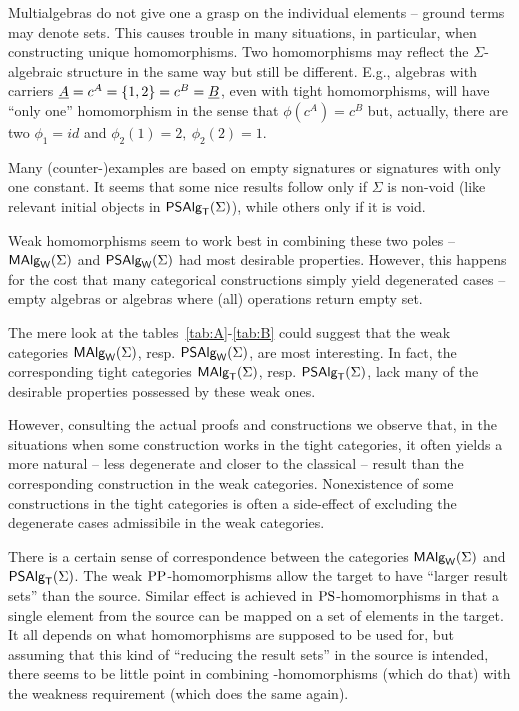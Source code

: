 \documentclass[10pt]{article}
\begin{document}
\begin{LS}
\item
Multialgebras do not give one a grasp on the individual elements --
ground terms may denote sets. This causes trouble in many situations,
in particular, when constructing unique homomorphisms. Two
homomorphisms may reflect the $\Sigma$-algebraic structure in the same
way but still be different.  E.g., algebras with carriers $\underline {A}=c^A=\{1,2\}=c^B=\underline {B}$, even with tight homomorphisms, will have
``only one'' homomorphism in the sense that $\phi(c^A)=c^B$ but,
actually, there are two $\phi_1 = id$ and $\phi_2(1)=2,\ \phi_2(2)=1$.

\item
Many (counter-)examples are based on empty signatures or signatures
with only one constant.  It seems that some nice results follow only
if $\Sigma$ is non-void (like relevant initial objects in $\mbox{\sf PSAlg}_{\sf T}(\Sigma)$),
while others only if it is void.
\begin{LSA}
\item
Weak homomorphisms seem to work best in combining these two poles --
$\mbox{\rm\sf MAlg}_{\sf W}(\Sigma)$ and $\mbox{\sf PSAlg}_{\sf W}(\Sigma)$ had most desirable properties. However, this
happens for the cost that many categorical constructions simply yield
degenerated cases -- empty algebras or algebras where (all) operations
return empty set.
\item
The mere look at the tables~\ref{tab:A}-\ref{tab:B} could suggest that
the weak categories $\mbox{\rm\sf MAlg}_{\sf W}(\Sigma)$, resp. $\mbox{\sf PSAlg}_{\sf W}(\Sigma)$, are most interesting. In
fact, the corresponding tight categories $\mbox{\rm\sf MAlg}_{\sf T}(\Sigma)$, resp. $\mbox{\sf PSAlg}_{\sf T}(\Sigma)$, lack
many of the desirable properties possessed by these weak ones.

However, consulting the actual proofs and constructions we observe
that, in the situations when some construction works in the tight
categories, it often yields a more natural -- less degenerate and
closer to the classical -- result than the corresponding construction
in the weak categories. Nonexistence of some constructions in the
tight categories is often a side-effect of excluding the degenerate
cases admissibile in the weak categories.
\end{LSA}

\item
There is a certain sense of correspondence between the categories
$\mbox{\rm\sf MAlg}_{\sf W}(\Sigma)$ and $\mbox{\sf PSAlg}_{\sf T}(\Sigma)$.  The weak ${\rm PP}$-homomorphisms allow the target
to have ``larger result sets'' than the source. Similar effect is
achieved in ${\rm PS}$-homomorphisms in that a single element from the
source can be mapped on a set of elements in the target. It all
depends on what homomorphisms are supposed to be used for, but
assuming that this kind of ``reducing the result sets'' in the source
is intended, there seems to be little point in combining
\PS-homomorphisms (which do that) with the weakness requirement (which
does the same again).


\end{LS}
\end{document}

